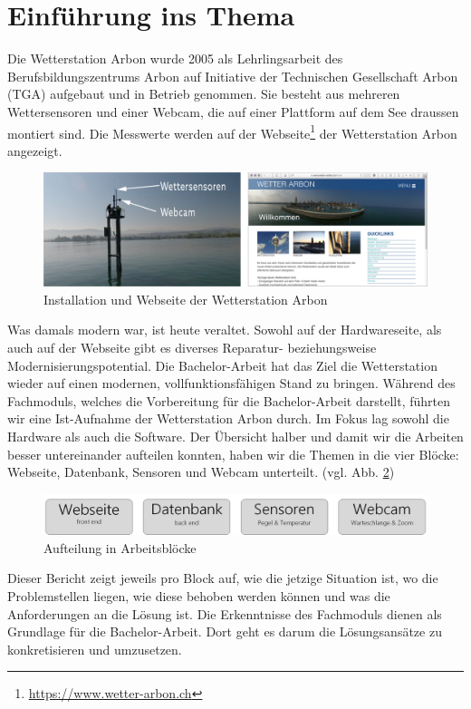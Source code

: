 \section*{Einführung ins Thema}

Die Wetterstation Arbon wurde 2005 als Lehrlingsarbeit des Berufsbildungszentrums Arbon auf Initiative der Technischen Gesellschaft Arbon (TGA) aufgebaut und in Betrieb genommen. Sie besteht aus mehreren Wettersensoren und einer Webcam, die auf einer Plattform auf dem See draussen montiert sind. Die Messwerte werden auf der Webseite\footnote{ \url{https://www.wetter-arbon.ch}}  der Wetterstation Arbon angezeigt.

\begin{figure}[h!]
	\centering
	\includegraphics[width=1\linewidth]{img/kombi}
	\caption{Installation und Webseite der Wetterstation Arbon}
	\label{img:wetterstation}
\end{figure}

Was damals modern war, ist heute veraltet. Sowohl auf der Hardwareseite, als auch auf der Webseite gibt es diverses Reparatur- beziehungsweise Modernisierungspotential. Die Bachelor-Arbeit hat das Ziel die Wetterstation wieder auf einen modernen, vollfunktionsfähigen Stand zu bringen. Während des Fachmoduls, welches die Vorbereitung für die Bachelor-Arbeit darstellt, führten wir eine Ist-Aufnahme der Wetterstation Arbon durch. Im Fokus lag sowohl die Hardware als auch die Software. Der Übersicht halber und damit wir die Arbeiten besser untereinander aufteilen konnten, haben wir die Themen in die vier Blöcke:  Webseite, Datenbank, Sensoren und Webcam unterteilt. (vgl. Abb. \ref{img:module})

\vspace{5mm} %

\begin{figure}[h!]
	\centering
	\includegraphics[width=0.8\linewidth]{img/module}
	\caption{Aufteilung in Arbeitsblöcke}
	\label{img:module}
\end{figure}

Dieser Bericht zeigt jeweils pro Block auf, wie die jetzige Situation ist, wo die Problemstellen liegen, wie diese behoben werden können und was die Anforderungen an die Lösung ist. Die Erkenntnisse des Fachmoduls dienen als Grundlage für die Bachelor-Arbeit. Dort geht es darum die Lösungsansätze zu konkretisieren und umzusetzen.

\newpage